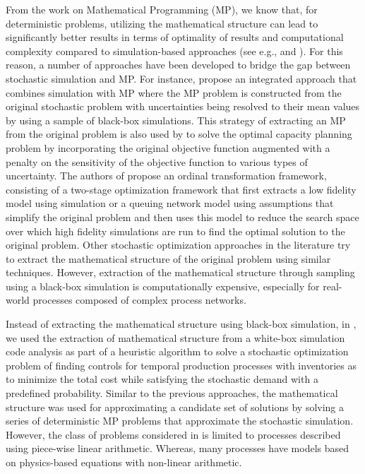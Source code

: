 \documentclass[a4paper, 12pt]{article} %
\begin{document}

From the work on Mathematical Programming (MP), we know that, for deterministic problems, utilizing the mathematical structure can lead to significantly better results in terms of optimality of results and computational complexity compared to simulation-based approaches (see e.g., \cite{Amaran2016} and \cite{Klemmt2009}). 
For this reason, a number of approaches have been developed to bridge the gap between stochastic simulation and MP.
For instance, \cite{thompson_integrated_1990} propose an integrated approach that combines simulation with MP where the MP problem is constructed from the original stochastic problem with uncertainties being resolved to their mean values by using a sample of black-box simulations. This strategy of extracting an MP from the original problem is also used by \cite{paraskevopoulos_robust_1991} to solve the optimal capacity planning problem by incorporating the original objective function augmented with a penalty on the sensitivity of the objective function to various types of uncertainty.
The authors of \cite{Xu2014MultiFid} propose an ordinal transformation framework, 
consisting of a two-stage optimization framework that first extracts a low fidelity model using simulation or a queuing network model using assumptions that simplify the original problem and then uses this model to reduce the search space over which high fidelity simulations are run to find the optimal solution to the original problem.
Other stochastic optimization approaches in the literature try to extract the mathematical structure of the original problem using similar techniques.
However, extraction of the mathematical structure through sampling using a black-box simulation is computationally expensive, especially for real-world processes composed of complex process networks.

Instead of extracting the mathematical structure using black-box simulation, in \cite{Krishnamoorthy2015}, we used the extraction of mathematical structure from a white-box simulation code analysis as part of a heuristic algorithm to solve a stochastic optimization problem of finding controls for temporal production processes with inventories as to minimize the total cost while satisfying the stochastic demand with a predefined probability.
Similar to the  previous approaches, the mathematical structure was used for approximating a candidate set of solutions by solving a series of deterministic MP problems that approximate the stochastic simulation. 
However, the class of problems considered in \cite{Krishnamoorthy2015} is limited to processes described using piece-wise linear arithmetic. 
Whereas, many processes have models based on physics-based equations with non-linear arithmetic. 
\end{document}
